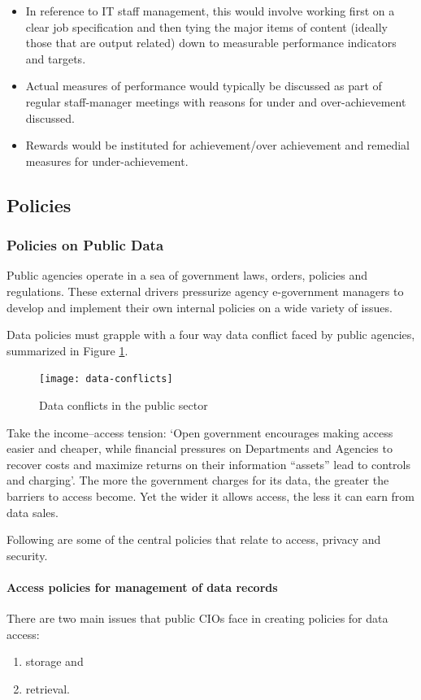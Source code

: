 \begin{itemize}
	\item In reference to IT staff management, this would involve working first on a clear job specification and then tying the major items of content (ideally those that are output related) down to measurable performance indicators and targets. 
	\item Actual measures of performance would typically be discussed as part of regular staff-manager meetings with reasons for under and over-achievement discussed. 
	\item Rewards would be instituted for achievement/over achievement and remedial measures for
	under-achievement.
\end{itemize}

\subsection{Policies}
\subsubsection{Policies on Public Data}
 Public agencies operate in a sea of government laws, orders, policies and regulations. These external drivers pressurize agency e-government managers to develop and implement their own internal policies on
 a wide variety of issues.

Data policies must grapple with a four way data conflict faced by public agencies, summarized in Figure \ref{fig:data-conflicts}.

\begin{figure}[th]
	\centering
	\texttt{[image: data-conflicts]}
	\caption{Data conflicts in the public sector}
	\label{fig:data-conflicts}
\end{figure}


Take the income–access tension: `Open government encourages making access easier and cheaper, while financial pressures on Departments and Agencies to recover costs and maximize returns on their information ``assets'' lead to controls and charging’. The more the government charges for its data, the greater the barriers to access become. Yet the wider it allows access, the less it can earn from data sales.


Following are some of the central policies that relate to access, privacy and security.

\paragraph*{Access policies for management of data records}
There are two main issues that public CIOs face in creating policies for data access: 
\begin{multicols}{2}
	\begin{enumerate}
		\item storage and 
		\item retrieval.
	\end{enumerate}
\end{multicols}



